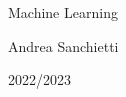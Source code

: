 \begin{titlingpage*}
   \begin{center}
       \vspace*{5cm}

       {\HUGE Machine Learning}
       
       \vspace{3cm}

       {\LARGE Andrea Sanchietti}
    

       \vspace{5cm}

       {\Large 2022/2023}
   \end{center}
\end{titlingpage*}
